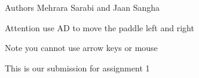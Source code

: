 \begin{DoxyAuthor}{Authors}
Mehrara Sarabi and Jaan Sangha
\end{DoxyAuthor}
\begin{DoxyAttention}{Attention}
use AD to move the paddle left and right
\end{DoxyAttention}
\begin{DoxyNote}{Note}
you cannot use arrow keys or mouse
\end{DoxyNote}
This is our submission for assignment 1 